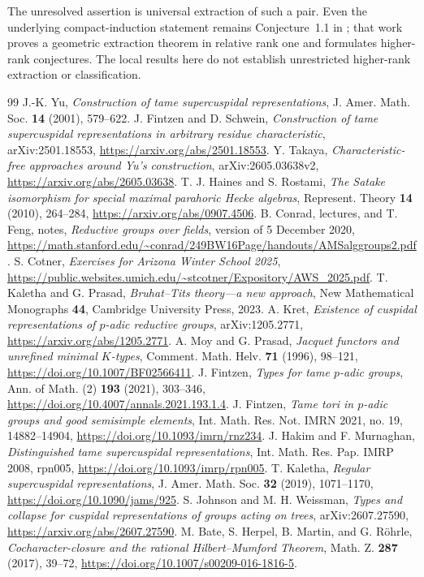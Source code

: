 \documentclass[10pt]{amsart}
\begin{document}
The unresolved assertion is universal extraction of such a pair. Even the
underlying compact-induction statement remains Conjecture~1.1 in
\cite{JohnsonWeissman}; that work proves a geometric extraction theorem in
relative rank one and formulates higher-rank conjectures. The local results
here do not establish unrestricted higher-rank extraction or classification.

\begin{thebibliography}{99}
J.-K. Yu, \emph{Construction of tame supercuspidal representations},
J. Amer. Math. Soc. \textbf{14} (2001), 579--622.
J. Fintzen and D. Schwein, \emph{Construction of tame supercuspidal representations
in arbitrary residue characteristic}, arXiv:2501.18553,
\url{https://arxiv.org/abs/2501.18553}.
Y. Takaya, \emph{Characteristic-free approaches around Yu's construction},
arXiv:2605.03638v2, \url{https://arxiv.org/abs/2605.03638}.
T. J. Haines and S. Rostami, \emph{The Satake isomorphism for special maximal
parahoric Hecke algebras}, Represent. Theory \textbf{14} (2010), 264--284,
\url{https://arxiv.org/abs/0907.4506}.
B. Conrad, lectures, and T. Feng, notes, \emph{Reductive groups over fields},
version of 5 December 2020,
\url{https://math.stanford.edu/~conrad/249BW16Page/handouts/AMSalggroups2.pdf}.
S. Cotner, \emph{Exercises for Arizona Winter School 2025},
\url{https://public.websites.umich.edu/~stcotner/Expository/AWS_2025.pdf}.
T. Kaletha and G. Prasad, \emph{Bruhat--Tits theory---a new approach},
New Mathematical Monographs \textbf{44}, Cambridge University Press, 2023.
A. Kret, \emph{Existence of cuspidal representations of $p$-adic reductive groups},
arXiv:1205.2771, \url{https://arxiv.org/abs/1205.2771}.
A. Moy and G. Prasad, \emph{Jacquet functors and unrefined minimal $K$-types},
Comment. Math. Helv. \textbf{71} (1996), 98--121,
\url{https://doi.org/10.1007/BF02566411}.
J. Fintzen, \emph{Types for tame $p$-adic groups},
Ann. of Math. (2) \textbf{193} (2021), 303--346,
\url{https://doi.org/10.4007/annals.2021.193.1.4}.
J. Fintzen, \emph{Tame tori in $p$-adic groups and good semisimple elements},
Int. Math. Res. Not. IMRN 2021, no. 19, 14882--14904,
\url{https://doi.org/10.1093/imrn/rnz234}.
J. Hakim and F. Murnaghan, \emph{Distinguished tame supercuspidal representations},
Int. Math. Res. Pap. IMRP 2008, rpn005,
\url{https://doi.org/10.1093/imrp/rpn005}.
T. Kaletha, \emph{Regular supercuspidal representations},
J. Amer. Math. Soc. \textbf{32} (2019), 1071--1170,
\url{https://doi.org/10.1090/jams/925}.
S. Johnson and M. H. Weissman, \emph{Types and collapse for cuspidal
representations of groups acting on trees}, arXiv:2607.27590,
\url{https://arxiv.org/abs/2607.27590}.
M. Bate, S. Herpel, B. Martin, and G. R\"ohrle,
\emph{Cocharacter-closure and the rational Hilbert--Mumford Theorem},
Math. Z. \textbf{287} (2017), 39--72,
\url{https://doi.org/10.1007/s00209-016-1816-5}.
\end{thebibliography}
\end{document}
